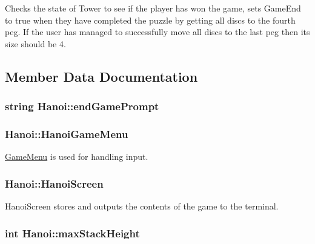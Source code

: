 Checks the state of Tower to see if the player has won the game, sets Game\-End to true when they have completed the puzzle by getting all discs to the fourth peg. If the user has managed to successfully move all discs to the last peg then its size should be 4. 

\subsection{Member Data Documentation}
\hypertarget{classHanoi_a43513810a88b1c43a61dc26838ce6446}{
\subsubsection[{end\-Game\-Prompt}]{\setlength{\rightskip}{0pt plus 5cm}string Hanoi\-::end\-Game\-Prompt\hspace{0.3cm}{\ttfamily [private]}}}\label{classHanoi_a43513810a88b1c43a61dc26838ce6446}
\hypertarget{classHanoi_a7d73005d59c4f2134ffd564964ab3f49}{
\subsubsection[{Hanoi\-Game\-Menu}]{ Hanoi\-::\-Hanoi\-Game\-Menu\hspace{0.3cm}{\ttfamily [private]}}}\label{classHanoi_a7d73005d59c4f2134ffd564964ab3f49}


\hyperlink{classGameMenu}{Game\-Menu} is used for handling input. 

\hypertarget{classHanoi_a1b9bfd6a0428f772d78b66a5a3268c4c}{
\subsubsection[{Hanoi\-Screen}]{ Hanoi\-::\-Hanoi\-Screen\hspace{0.3cm}{\ttfamily [private]}}}\label{classHanoi_a1b9bfd6a0428f772d78b66a5a3268c4c}


Hanoi\-Screen stores and outputs the contents of the game to the terminal. 

\hypertarget{classHanoi_a826f3bc786cb5c7b6499508d0b8bc9b4}{
\subsubsection[{max\-Stack\-Height}]{\setlength{\rightskip}{0pt plus 5cm}int Hanoi\-::max\-Stack\-Height\hspace{0.3cm}{\ttfamily [private]}}}\label{classHanoi_a826f3bc786cb5c7b6499508d0b8bc9b4}


